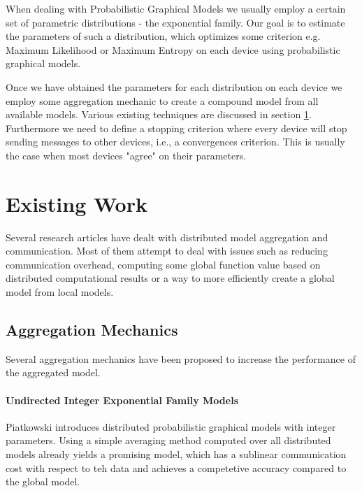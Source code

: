    

    When dealing with Probabilistic Graphical Models we usually employ a certain set of parametric distributions - the exponential family. 
    Our goal is to estimate the parameters of such a distribution, which optimizes some criterion e.g. Maximum Likelihood or Maximum Entropy on each device using probabilistic graphical models.

    Once we have obtained the parameters for each distribution on each device we employ some aggregation mechanic to create a compound model from all available models. 
    Various existing techniques are discussed in section \ref{sec:ew}.
    Furthermore we need to define a stopping criterion where every device will stop sending messages to other devices, i.e., a convergences criterion.
    This is usually the case when most devices "agree" on their parameters.

    \section{Existing Work}
    \label{sec:ew}
    Several research articles have dealt with distributed model aggregation and communication. 
    Most of them attempt to deal with issues such as reducing communication overhead, computing some global function value based on distributed computational results or a way to more efficiently create a global model from local models.

    \subsection{Aggregation Mechanics}

    Several aggregation mechanics have been proposed to increase the performance of the aggregated model. 

    \paragraph{Undirected Integer Exponential Family Models}
    Piatkowski \cite{piatkowskidistributed} introduces distributed probabilistic graphical models with integer parameters. 
    Using a simple averaging method computed over all distributed models already yields a promising model, which has a sublinear communication cost with respect to teh data and achieves a competetive accuracy compared to the global model. 
    
